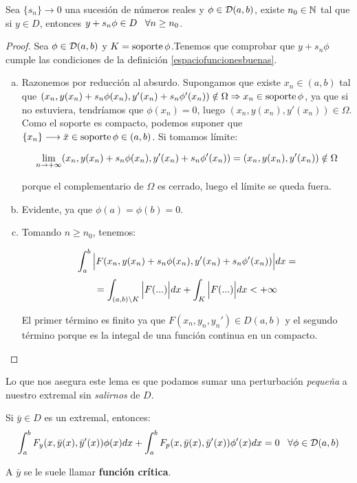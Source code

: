 \begin{lemma}
\label{lemmatecnico}
Sea $\{s_n\}\longrightarrow 0$ una sucesión de números reales y $\phi\in \mathcal{D}(a,b)$, existe $n_0\in\mathbb{N}$ tal que si $y\in D$, entonces $y+s_n\phi\in D \;\;\; \forall n\geq n_0$.
\end{lemma}
\begin{proof}

Sea $\phi\in\mathcal{D}(a,b)$ y $K=\operatorname{soporte}\phi$.Tenemos que comprobar que $y+s_n\phi$ cumple las condiciones de la definición \ref{espaciofuncionesbuenas}.

\begin{enumerate}[(a)]
\item Razonemos por reducción al absurdo. Supongamos que existe $x_n\in(a,b)$ tal que $(x_n,y(x_n)+s_n\phi(x_n),y'(x_n)+s_n\phi'(x_n))\notin \Omega \Rightarrow x_n\in\operatorname{soporte}\phi$, ya que si no estuviera, tendríamos que $\phi(x_n)=0$, luego $(x_n,y(x_n),y'(x_n))\in \Omega$. Como el soporte es compacto, podemos suponer que $\{x_n\}\longrightarrow\bar{x}\in\operatorname{soporte}\phi\in(a,b)$. Si tomamos límite:

\[
\displaystyle\lim_{  n  \to +\infty }  (x_n,y(x_n)+s_n\phi(x_n),y'(x_n)+s_n\phi'(x_n)) =(x_n,y(x_n),y'(x_n))\notin\Omega 
\]

porque el complementario de $\Omega$ es cerrado, luego el límite se queda fuera.
\item Evidente, ya que $\phi(a)=\phi(b)=0$.
\item Tomando $n\geq n_0$, tenemos:

\[\displaystyle\int_{ a }^{ b } \Big|F(x_n,y(x_n)+s_n\phi(x_n),y'(x_n)+s_n\phi'(x_n))\Big|dx=\]
\[
=\displaystyle\int_{ (a,b)\backslash K }^{  } \Big|F(...)\Big|dx+\displaystyle\int_{ K }^{  } \Big|F(...)\Big|dx < +\infty
\]

El primer término es finito ya que $F(x_n,y_n,y_n')\in D(a,b)$ y el segundo término porque es la integal de una función continua en un compacto. 
\end{enumerate}
\end{proof}
Lo que nos asegura este lema es que podamos sumar una perturbación \textit{pequeña} a nuestro extremal sin \textit{salirnos} de $D$.

\begin{theorem}
\label{theorem:1.7}
Si $\bar{y}\in D$ es un extremal, entonces:
\[
\displaystyle\int_{ a }^{ b } F_y(x,\bar{y}(x), \bar{y}'(x))\phi(x)dx+\displaystyle\int_{ a }^{ b } F_p(x,\bar{y}(x), \bar{y}'(x))\phi'(x)dx=0 \;\;\; \forall \phi\in \mathcal{D}(a,b)
\]

A $\bar{y}$ se le suele llamar \textbf{función crítica}.
\end{theorem}

